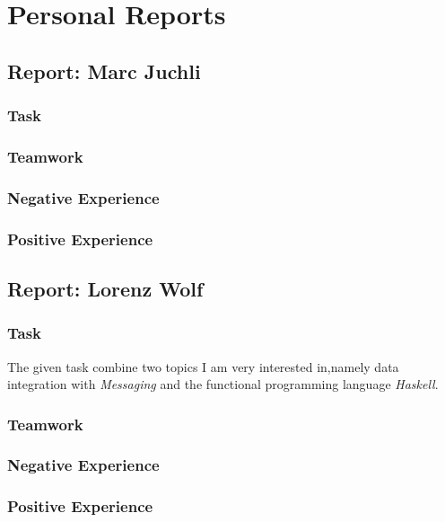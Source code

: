 \chapter{Personal Reports}

\section*{Report: Marc Juchli}

\subsection*{Task}
\subsection*{Teamwork}
\subsection*{Negative Experience}
\subsection*{Positive Experience}


\section*{Report: Lorenz Wolf}

\subsection*{Task}
The given task combine two topics I am very interested in,namely data
integration with \textit{Messaging} and the functional programming language \textit{Haskell}.

\subsection*{Teamwork}
\subsection*{Negative Experience}
\subsection*{Positive Experience}


